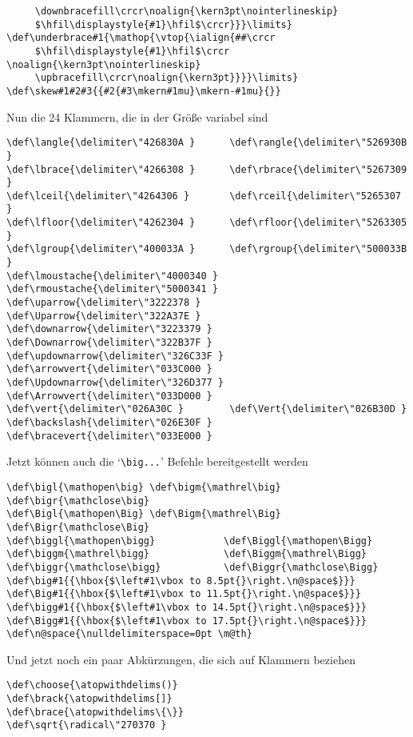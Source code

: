 \begin{appendix}
\begin{verbatim}
     \downbracefill\crcr\noalign{\kern3pt\nointerlineskip}
     $\hfil\displaystyle{#1}\hfil$\crcr}}}\limits}
\def\underbrace#1{\mathop{\vtop{\ialign{##\crcr
     $\hfil\displaystyle{#1}\hfil$\crcr \noalign{\kern3pt\nointerlineskip}
     \upbracefill\crcr\noalign{\kern3pt}}}}\limits}
\def\skew#1#2#3{{#2{#3\mkern#1mu}\mkern-#1mu}{}}
\end{verbatim}
Nun die 24 Klammern, die in der Gr\"o\ss{}e variabel sind
\begin{verbatim}
\def\langle{\delimiter\"426830A }      \def\rangle{\delimiter\"526930B }
\def\lbrace{\delimiter\"4266308 }      \def\rbrace{\delimiter\"5267309 }
\def\lceil{\delimiter\"4264306 }       \def\rceil{\delimiter\"5265307 }
\def\lfloor{\delimiter\"4262304 }      \def\rfloor{\delimiter\"5263305 }
\def\lgroup{\delimiter\"400033A }      \def\rgroup{\delimiter\"500033B }
\def\lmoustache{\delimiter\"4000340 }  \def\rmoustache{\delimiter\"5000341 }
\def\uparrow{\delimiter\"3222378 }     \def\Uparrow{\delimiter\"322A37E }
\def\downarrow{\delimiter\"3223379 }   \def\Downarrow{\delimiter\"322B37F }
\def\updownarrow{\delimiter\"326C33F } \def\arrowvert{\delimiter\"033C000 }
\def\Updownarrow{\delimiter\"326D377 } \def\Arrowvert{\delimiter\"033D000 }  
\def\vert{\delimiter\"026A30C }        \def\Vert{\delimiter\"026B30D }
\def\backslash{\delimiter\"026E30F }   \def\bracevert{\delimiter\"033E000 }
\end{verbatim}
Jetzt k\"onnen auch die `\verb|\big...|' Befehle bereitgestellt werden
\begin{verbatim}
\def\bigl{\mathopen\big} \def\bigm{\mathrel\big} \def\bigr{\mathclose\big}
\def\Bigl{\mathopen\Big} \def\Bigm{\mathrel\Big} \def\Bigr{\mathclose\Big}
\def\biggl{\mathopen\bigg}            \def\Biggl{\mathopen\Bigg}
\def\biggm{\mathrel\bigg}             \def\Biggm{\mathrel\Bigg}
\def\biggr{\mathclose\bigg}           \def\Biggr{\mathclose\Bigg}
\def\big#1{{\hbox{$\left#1\vbox to 8.5pt{}\right.\n@space$}}}
\def\Big#1{{\hbox{$\left#1\vbox to 11.5pt{}\right.\n@space$}}}
\def\bigg#1{{\hbox{$\left#1\vbox to 14.5pt{}\right.\n@space$}}}
\def\Bigg#1{{\hbox{$\left#1\vbox to 17.5pt{}\right.\n@space$}}}
\def\n@space{\nulldelimiterspace=0pt \m@th}
\end{verbatim}
Und jetzt noch ein paar 
Abk\"urzungen, die sich auf
Klammern beziehen
\begin{verbatim}
\def\choose{\atopwithdelims()}
\def\brack{\atopwithdelims[]}
\def\brace{\atopwithdelims\{\}}
\def\sqrt{\radical\"270370 }

\end{verbatim}
\end{appendix}
